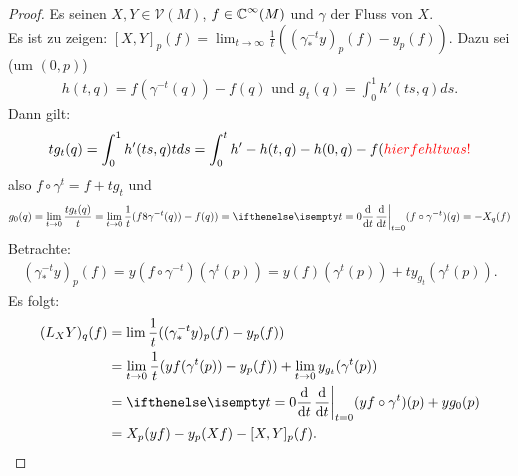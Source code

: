 \begin{proof}
  Es seinen $X,Y \in \mathcal V(M)$, $f \in \operatorname{\mathbb{C}}^{\infty}(M)$ und $\gamma$ der Fluss von $X$.\\
Es ist zu zeigen: $[X,Y]_p(f) = \lim_{t \to \infty} \frac{1}{t}\left((\gamma_{*}^{-t}y)_p(f)-y_p(f)\right)$.
Dazu sei (um $(0,p)$)
\begin{align*}
  h(t,q) = f(\gamma^{-t}(q))-f(q) \text{ und } g_t(q) = \int_0^1 h'(ts,q)ds.
\end{align*}
Dann gilt:
\begin{align*}
  tg_t(q) = \int_0^1h'(ts,q)tds = \int_0^th' - h(t,q) - h(0,q) - f(\textcolor{red}{hier fehlt was!}
\end{align*}
also $f \circ \gamma^t = f + tg_t$ und 
\begin{align*}
  g_0(q) = \lim_{t \to 0} \frac{tg_t(q)}{t} = \lim_{t \to 0}\frac{1}t(f8\gamma^{-t}(q))-f(q)) = \difffrac[t=0]{}{t}(f \circ \gamma^{-t})(q) = -X_q(f)
\end{align*}
Betrachte:
\begin{align*}
  (\gamma_{*}^{-t}y)_p(f) = y(f \circ \gamma^{-t})(\gamma^t(p)) = y(f)(\gamma^t(p)) + ty_{g_t}(\gamma^t(p)).
\end{align*}
Es folgt:
\begin{align*}
  (L_XY)_q(f) & = \lim \frac{1}t ((\gamma_{*}^{-t}y)_p(f) - y_p(f))\\
& = \lim_{t\to 0} \frac{1}t (yf(\gamma^t(p))-y_p(f)) + \lim_{t\to 0} y_{g_t}(\gamma^t(p))\\
& = \difffrac[t=0]{}{t}(yf \circ \gamma^t)(p) + yg_0(p)\\
& = X_p(yf) - y_p(Xf) - [X,Y]_p(f).
\end{align*} 
\end{proof}


